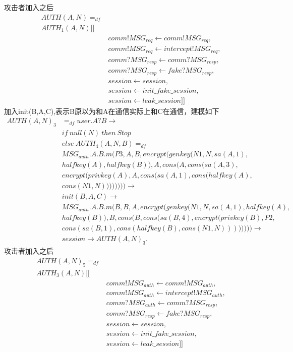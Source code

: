 \documentclass[UTF8]{ctexart}
\begin{document}
{攻击者加入之后
	\begin{equation}
		\begin{aligned}
			AUTH(A,N)=_{df}\\
			AUTH_{1}(A,N) [[ \\
			&comm!MSG_{req} \leftarrow comm!MSG_{req}, \\
			&comm!MSG_{req} \leftarrow intercept!MSG_{req}, \\
			&comm?MSG_{resp} \leftarrow comm?MSG_{resp},\\
			&comm?MSG_{resp} \leftarrow fake?MSG_{resp},\\
			&session \leftarrow session, \\
			&session \leftarrow init\_fake\_session, \\
			&session \leftarrow leak\_session]]
	\end{aligned}
	\end{equation}
	加入init(B,A,C),表示B原以为和A在通信实际上和C在通信，建模如下
	\begin{equation}
		\begin{aligned}
			AUTH(A,N)_{3} &=_{df} user.A?B \rightarrow \\
			& if \   null(N) \   then  \  Stop \\
			& else \  AUTH_{4}(A,N,B)=_{df} \\
			&MSG_{auth}.A.B.m(P3,A,B,encrypt(genkey(N1,N,sa(A,1),\\ 
			&halfkey(A),halfkey(B)),A,cons(A,cons(sa(A,3),\\ 
			&encrypt(privkey(A),A,cons(sa(A,1),cons(halfkey(A),\\ 
			&cons(N1,N)))))))) \rightarrow \\
			&init(B,A,C) \rightarrow \\
			&MSG_{auth}.A.B.m(B,B,A,encrypt(genkey(N 1,N,sa(A,1),halfkey(A), \\ 
			&halfkey(B)),B,cons(B,cons(sa(B,4),encrypt(privkey(B),P2,\\
			&cons(sa(B,1),cons(halfkey(B),cons(N1,N))))))))\rightarrow \\
			&session \rightarrow AUTH(A,N)_{3}.
	\end{aligned}
	\end{equation}
	攻击者加入之后
	\begin{equation}
		\begin{aligned}
			AUTH(A,N)_{5}=_{df}\\
			AUTH_{3}(A,N) [[ \\
			&comm!MSG_{auth} \leftarrow comm!MSG_{auth}, \\
			&comm!MSG_{auth} \leftarrow intercept!MSG_{auth}, \\
			&comm?MSG_{auth} \leftarrow comm?MSG_{resp},\\
			&comm?MSG_{resp} \leftarrow fake?MSG_{resp},\\
			&session \leftarrow session, \\
			&session \leftarrow init\_fake\_session, \\
			&session \leftarrow leak\_session]]
	\end{aligned}
	\end{equation}

}
\end{document}

